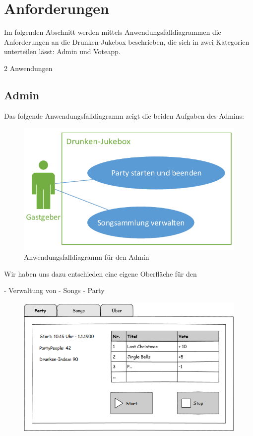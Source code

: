 \section{Anforderungen}
Im folgenden Abschnitt werden mittels Anwendungsfalldiagrammen die Anforderungen an die Drunken-Jukebox beschrieben, die sich in zwei Kategorien unterteilen lässt: Admin und Voteapp.

2 Anwendungen


\subsection{Admin}
Das folgende Anwendungsfalldiagramm zeigt die beiden Aufgaben des Admins:

\begin{figure}[H]
\centering
\includegraphics[width=0.7\linewidth]{Bilder/AdminUseCase}
\caption{Anwendungsfalldiagramm für den Admin}
\label{fig:AdminUseCase}
\end{figure}

Wir haben uns dazu entschieden eine eigene Oberfläche für den 



- Verwaltung von
  - Songs
  - Party
  
\begin{figure}[H]
\centering
\includegraphics[width=0.95\linewidth]{Bilder/MockParty}
\caption{}
\label{fig:MockParty}
\end{figure}

